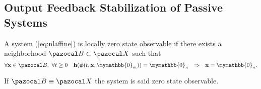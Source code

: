 \subsection{Output Feedback Stabilization of Passive Systems}\label{sec:OutFeedStab}
%
\begin{defn}[Observability]
	A system (\ref{eq:nlaffine}) is locally zero state observable if there exists a neighborhood $\B\subset\X$ such that
	\begin{equation}
	    \forall \xb\in \B,~\forall t\geq 0 \quad \hb(\bm\phi(t,\xb,\mymathbb{0}_m))=\mymathbb{0}_n~~\Rightarrow~~ \xb=\mymathbb{0}_n.
	\end{equation}
	
	If $\B\equiv\X$ the system is said zero state observable.
\end{defn}

